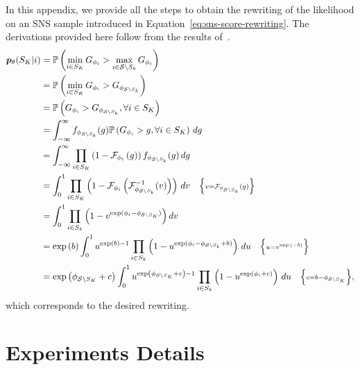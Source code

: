 In this appendix, we provide all the steps to obtain the rewriting of the likelihood on an SNS sample introduced in Equation~\eqref{eq:sns-score-rewriting}. The derivations provided here follow from the results of~\citet{kool2020estimating}. 
\begin{multline*}
    \begin{aligned}
    {{\bm{p}}_\theta}(S_K|i) &=\mathbb{P}\left(\min_{i\in S_K} G_{\phi_i} > \max_{i\in {\mathcal{S}\setminus S_k}} G_{\phi_i}\right)\\
    &=\mathbb{P}\left(\min_{i\in S_K} G_{\phi_i} > G_{\phi_{\mathcal{S}\setminus S_k}}\right)\\
    &= \mathbb{P}\left(G_{\phi_i} > G_{\phi_{\mathcal{S} \setminus S_k}}, \forall i \in S_K\right)\\
    &= \int_{-\infty}^{\infty} f_{\phi_{\mathcal{S} \setminus S_k}}(g) \mathbb{P}\left(G_{\phi_i} > g, \forall i \in S_K\right)\,d g\\
    &= \int_{-\infty}^{\infty} \prod_{i\in S_K}\left(1 - \mathcal{F}_{\phi_i}\left(g\right)\right)f_{\phi_{\mathcal{S} \setminus S_k}}(g) \,d g \\
    &= \int_{0}^{1} \prod_{i\in S_K} \left(1 - \mathcal{F}_{\phi_i}\left(\mathcal{F}^{-1}_{\phi_{\mathcal{S}\setminus S_k}}(v)\right)\right)\,d v \quad {\scriptstyle \Big\{v = \mathcal{F}_{\phi_{\mathcal{S}\setminus S_k}}(g)\Big\}}\\
    &= \int_0^1\prod_{i\in S_k}\Big(1 - v^{\exp(\phi_i-\phi_{\mathcal{S}\setminus S_K})}\Big)\,d v\\
    &= \exp\left( b\right)\int_0^1 u^{\exp\left(b\right) - 1}\prod_{i\in S_k}\left(1 - u^{\exp(\phi_i  - \phi_{\mathcal{S} \setminus S_k} +  b)}\right)\,du \quad {\scriptstyle \Big\{u = v^{\exp{\left(-b\right)}}\Big\}}\\
    &= \exp\left( \phi_{\mathcal{S} \setminus S_K} + c\right)\int_0^1 u^{\exp\left(\phi_{\mathcal{S} \setminus S_K} + c\right) - 1}\prod_{i\in S_k}\left(1 - u^{\exp(\phi_i + c)}\right)\,du \quad {\scriptstyle \Big\{c = b - \phi_{\mathcal{S}\setminus S_K}\Big\}},
    \end{aligned}
\end{multline*}
which corresponds to the desired rewriting.

\section{Experiments Details}\label{a:exp}


